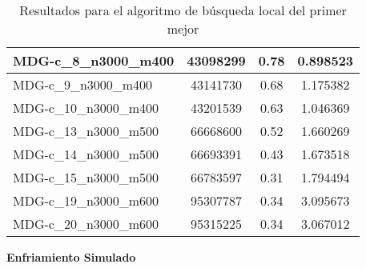 \documentclass[11pt,a4paper]{article}
\begin{document}
\begin{table}[H]
\begin{center}
\begin{tabular}{|l|c|c|c|}
			MDG-c\_8\_n3000\_m400 & 43098299 & 0.78 & 0.898523 \\ \hline
			MDG-c\_9\_n3000\_m400 & 43141730 & 0.68 & 1.175382 \\ \hline
			MDG-c\_10\_n3000\_m400 & 43201539 & 0.63 & 1.046369 \\ \hline
			MDG-c\_13\_n3000\_m500 & 66668600 & 0.52 & 1.660269 \\ \hline
			MDG-c\_14\_n3000\_m500 & 66693391 & 0.43 & 1.673518 \\ \hline
			MDG-c\_15\_n3000\_m500 & 66783597 & 0.31 & 1.794494 \\ \hline
			MDG-c\_19\_n3000\_m600 & 95307787 & 0.34 & 3.095673 \\ \hline
			MDG-c\_20\_n3000\_m600 & 95315225 & 0.34 & 3.067012 \\ \hline
		\end{tabular}
	\end{center}
	\caption{Resultados para el algoritmo de búsqueda local del primer mejor}
	\label{}
\end{table}
\newpage

\textbf{Enfriamiento Simulado}
\end{document}
